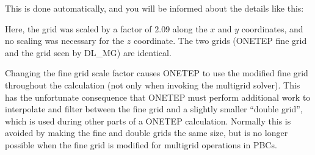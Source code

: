 \documentclass[letterpaper,10pt,english]{sphinxmanual}
\begin{document}
This is done automatically, and you will be informed about the details
like this:

%
\begin{sphinxVerbatim}[commandchars=\\\{\}]
        
                          
\PYG{p}{[}\PYG{p}{]}
               
                  
\end{sphinxVerbatim}

Here, the grid was scaled by a factor of \(2.09\) along the
\(x\) and \(y\) coordinates, and no scaling was necessary for
the \(z\) coordinate. The two grids (ONETEP fine grid and the grid
seen by DL\_MG) are identical.

Changing the fine grid scale factor causes ONETEP to use the modified
fine grid throughout the calculation (not only when invoking the
multigrid solver). This has the unfortunate consequence that ONETEP must
perform additional work to interpolate and filter between the fine grid
and a slightly smaller “double grid”, which is used during other parts
of a ONETEP calculation. Normally this is avoided by making the fine and
double grids the same size, but is no longer possible when the fine grid
is modified for multigrid operations in PBCs.
\end{document}
